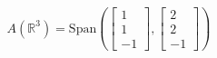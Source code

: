 \documentclass[preview]{standalone}
\begin{document}
\begin{align*}
A(\mathbb{R}^3) = \text{Span}\left(\begin{bmatrix} 1 \\ 1 \\ -1 \end{bmatrix}, \begin{bmatrix} 2 \\ 2 \\ -1 \end{bmatrix}\right)
\end{align*}
\end{document}
